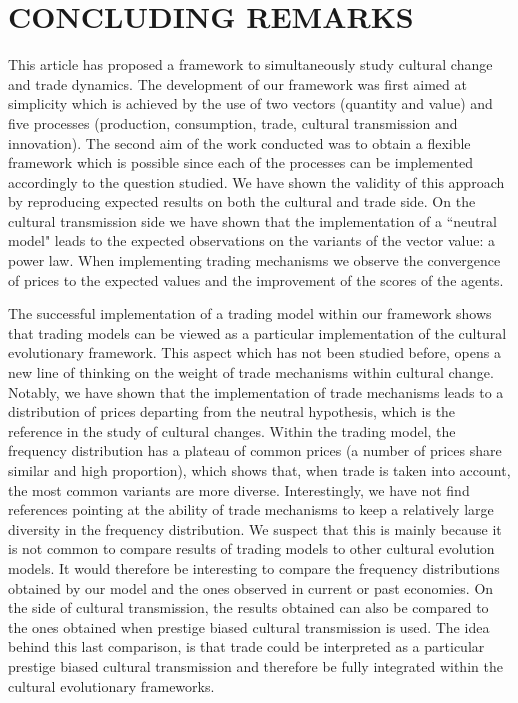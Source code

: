 \documentclass{wscpaperproc}
\begin{document}
\section{CONCLUDING REMARKS}

This article has proposed a framework to simultaneously study cultural change and trade dynamics. The development of our framework was first aimed at simplicity which is achieved by the use of two vectors (quantity and value) and five processes (production, consumption, trade, cultural transmission and innovation). The second aim of the work conducted was to obtain a flexible framework which is possible since each of the processes can be implemented accordingly to the question studied. We have shown the validity of this approach by reproducing expected results on both the cultural and trade side. On the cultural transmission side we have shown that the implementation of a ``neutral model" leads to the expected observations on the variants of the vector value: a power law. When implementing trading mechanisms we observe the convergence of prices to the expected values and the improvement of the scores of the agents.

The successful implementation of a trading model within our framework shows that trading models can be viewed as a particular implementation of the cultural evolutionary framework. This aspect which has not been studied before, opens a new line of thinking on the weight of trade mechanisms within cultural change. Notably, we have shown that the implementation of trade mechanisms leads to a distribution of prices departing from the neutral hypothesis, which is the reference in the study of cultural changes. Within the trading model, the frequency distribution has a plateau of common prices (a number of prices share similar and high proportion), which shows that, when trade is taken into account, the most common variants are more diverse. Interestingly, we have not find references pointing at the ability of trade mechanisms to keep a relatively large diversity in the frequency distribution. We suspect that this is mainly because it is not common to compare results of trading models to other cultural evolution models. It would therefore be interesting to compare the frequency distributions obtained by our model and the ones observed in current or past economies. On the side of cultural transmission, the results obtained can also be compared to the ones obtained when prestige biased cultural transmission is used. The idea behind this last comparison, is that trade could be interpreted as a particular prestige biased cultural transmission and therefore be fully integrated within the cultural evolutionary frameworks.
\end{document}
